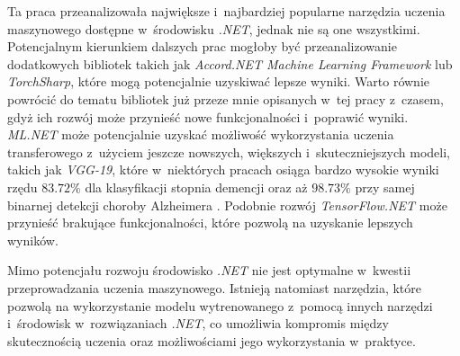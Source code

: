 Ta praca przeanalizowała największe i~najbardziej popularne narzędzia uczenia maszynowego dostępne w~środowisku \emph{.NET}, jednak nie są one wszystkimi.
Potencjalnym kierunkiem dalszych prac mogłoby być przeanalizowanie dodatkowych bibliotek takich jak \emph{Accord.NET Machine Learning Framework} lub \emph{TorchSharp}, które mogą potencjalnie uzyskiwać lepsze wyniki.
Warto równie powrócić do tematu bibliotek już przeze mnie opisanych w~tej pracy z~czasem, gdyż ich rozwój może przynieść nowe funkcjonalności i~poprawić wyniki.
\emph{ML.NET} może potencjalnie uzyskać możliwość wykorzystania uczenia transferowego z~użyciem jeszcze nowszych, większych i~skuteczniejszych modeli, takich jak \emph{VGG-19}, które w~niektórych pracach osiąga bardzo wysokie wyniki
rzędu $83.72\%$ dla klasyfikacji stopnia demencji oraz aż $98.73\%$ przy samej binarnej detekcji choroby Alzheimera \cite{mehmood2021transfer}.
Podobnie rozwój \emph{TensorFlow.NET} może przynieść brakujące funkcjonalności, które pozwolą na uzyskanie lepszych wyników.

Mimo potencjału rozwoju środowisko \emph{.NET} nie jest optymalne w~kwestii przeprowadzania uczenia maszynowego.
Istnieją natomiast narzędzia, które pozwolą na wykorzystanie modelu wytrenowanego z~pomocą innych narzędzi i~środowisk w~rozwiązaniach \emph{.NET}, co umożliwia kompromis między skutecznością uczenia oraz możliwościami jego wykorzystania w~praktyce.
